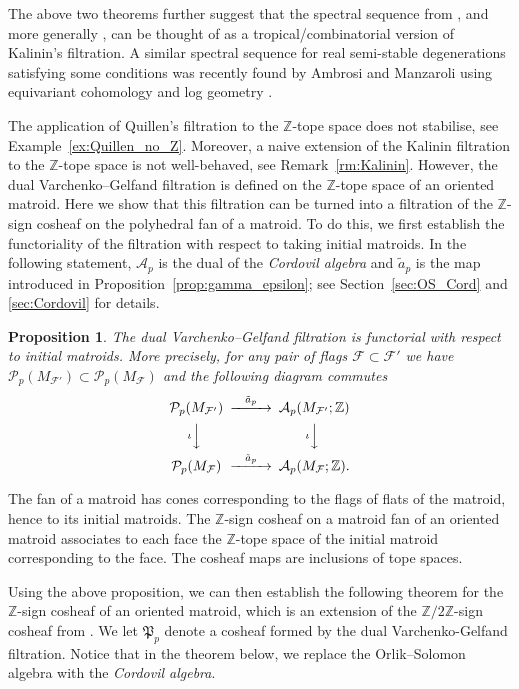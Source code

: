 \documentclass{amsart}
\newtheorem{proposition}[theorem]{Proposition}
\newcommand\Acal{{\mathcal A}}
\newcommand\Fcal{{\mathcal F}}
\newcommand\Pcal{{\mathcal P}}
\newcommand\ZZ{{\mathbb Z}}
\newcommand\Ztwo{{\mathbb Z}/2{\mathbb Z}}
\newcommand\Pfrak{{\mathfrak P}}
\newcommand\abv{{a}}
\begin{document}
{The above two theorems further suggest that the spectral sequence from \cite{RS}, and more generally \cite{RRS2}, can be thought of as a tropical/combinatorial version of Kalinin's filtration. A similar spectral sequence for real semi-stable degenerations satisfying some conditions was recently found by Ambrosi and Manzaroli using equivariant cohomology and log geometry \cite{ambrosimanzaroli}.

The application of Quillen's filtration to the $\ZZ$-tope space does not stabilise, see Example~\ref{ex:Quillen_no_Z}. 
Moreover, a naive extension of the Kalinin filtration to the $\ZZ$-tope space is not well-behaved, see Remark~\ref{rm:Kalinin}. 
However, the dual Varchenko--Gelfand filtration is defined on the $\ZZ$-tope space of an oriented matroid.
Here we show that this filtration can be turned into a filtration of the $\mathbb{Z}$-sign cosheaf on the polyhedral fan of a matroid. To do this, we first establish the functoriality of the filtration with respect to taking initial matroids. In the following statement, $\Acal_p$ is the dual of the {\em Cordovil algebra} and $\tilde{\abv}_p$ is the map introduced in Proposition~\ref{prop:gamma_epsilon}; see Section~\ref{sec:OS_Cord} and \ref{sec:Cordovil} for details.

\begin{proposition}\label{prop:Z-functorial}
The dual Varchenko--Gelfand filtration is functorial with respect to initial matroids. More precisely, for any pair of flags $\Fcal \subset \Fcal'$ we have $\Pcal_p(M_{\Fcal'})\subset \Pcal_p(M_\Fcal)$ and the following diagram commutes 
\begin{equation} \label{eq:GV_sheaf}
\begin{CD}
\Pcal_p(M_{\Fcal'})     @>\tilde{\abv}_p>> \Acal_p(M_{\Fcal'};\ZZ)\\
@V{\iota}VV        @V{\iota}VV\\
\Pcal_p(M_\Fcal)     @>\tilde{\abv}_p>>   \Acal_p(M_{\Fcal};\ZZ).
\end{CD}
\end{equation}
\end{proposition}

The fan of a matroid has cones corresponding to the flags of flats of the matroid, hence to its initial matroids. 
The $\ZZ$-sign cosheaf on a matroid fan of an oriented matroid associates to each face the $\ZZ$-tope space of the initial matroid corresponding to the face. 
The cosheaf maps are inclusions of tope spaces.

Using the above proposition, we can then establish the following theorem for the $\ZZ$-sign cosheaf of an oriented matroid, which is an extension of the $\Ztwo$-sign cosheaf from \cite{RRS2}. We let $\Pfrak_p$ denote a cosheaf formed by the dual Varchenko-Gelfand filtration.   Notice that in the theorem below, we  replace the Orlik--Solomon algebra with the {\em Cordovil algebra}. 

}
\end{document}
